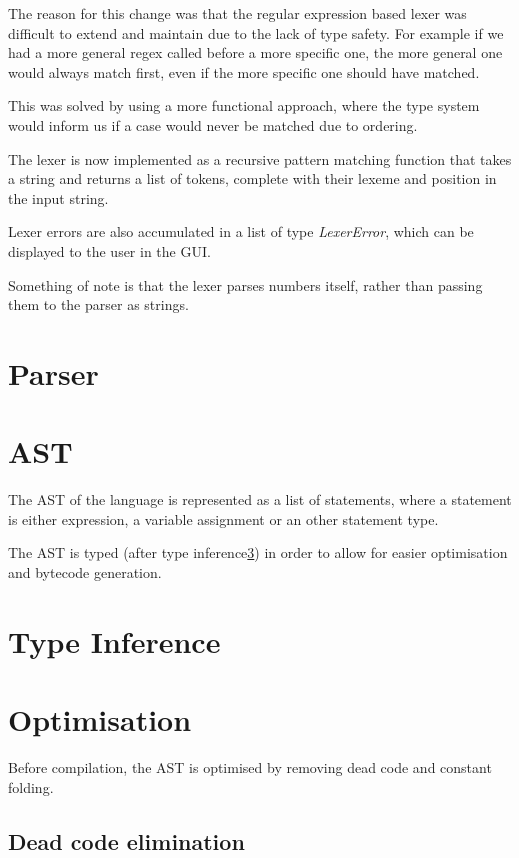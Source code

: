 \documentclass[a4paper, oneside, 11pt]{report}
\begin{document}
The reason for this change was that the regular expression based lexer was difficult to extend and maintain due to 
the lack of type safety.
For example if we had a more general regex called before a more specific one, the more general one would always match
first, even if the more specific one should have matched.

This was solved by using a more functional approach, where the type system would inform us if a case would never be 
matched due to ordering.

The lexer is now implemented as a recursive pattern matching function that takes a string and returns a list of 
tokens, complete with their lexeme and position in the input string.

Lexer errors are also accumulated in a list of type \textit{LexerError}, which can be displayed to the user in the GUI\@.

Something of note is that the lexer parses numbers itself, rather than passing them to the parser as strings.

\section{Parser}\label{sec:parser}

\section{AST}\label{sec:expression}

The AST of the language is represented as a list of statements, where a statement is either expression, a
variable assignment or an other statement type.

The AST is typed (after type inference\ref{sec:type-inference}) in order to allow for easier optimisation and
bytecode generation.

\section{Type Inference}\label{sec:type-inference}


\section{Optimisation}\label{sec:optimisation}

Before compilation, the AST is optimised by removing dead code and constant folding.

\subsection{Dead code elimination}\label{subsec:dead-code-elimination}
\end{document}
